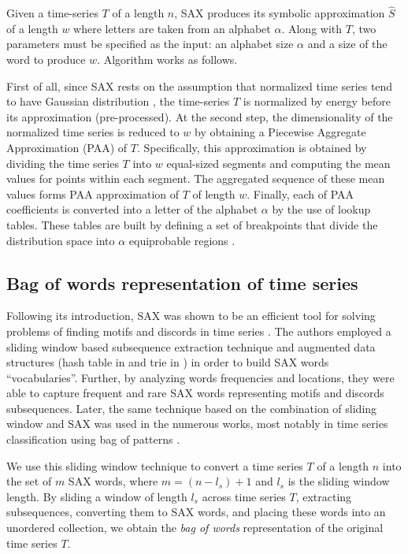 \documentclass{llncs}
\begin{document}
Given a time-series $T$ of a length $n$, SAX produces its symbolic approximation $\hat{S}$ of 
a length $w$ where letters are taken from an alphabet $\alpha$. 
Along with $T$, two parameters must be specified as the input: an alphabet size $\alpha$ and 
a size of the word to produce $w$. Algorithm works as follows. 

First of all, since SAX rests on the assumption that normalized time series  tend to have Gaussian 
distribution \cite{larsen_marx}, the time-series  $T$ is normalized by energy  
\cite{goldin_kanellakis} before its approximation (pre-processed). 
At the second step, the dimensionality of the normalized time series is reduced to $w$ by 
obtaining a Piecewise Aggregate Approximation (PAA) of $T$. 
Specifically, this approximation is obtained by dividing the time series $T$ into $w$ 
equal-sized segments and computing the mean values for points within each segment. 
The aggregated sequence of these mean values forms PAA approximation of $T$ of length $w$.
Finally, each of PAA coefficients is converted into a letter of the alphabet $\alpha$ by the use 
of lookup tables. These tables are built by defining a set of breakpoints that divide the 
distribution space into $\alpha$ equiprobable regions \cite{sax}.

\subsection{Bag of words representation of time series} \label{bow_representation}
Following its introduction, SAX was shown to be an efficient tool for solving problems 
of finding motifs and discords in time series \cite{motifs} \cite{hot_sax}. 
The authors employed a sliding window based subsequence extraction technique 
and augmented data structures (hash table in \cite{motifs} and trie in \cite{hot_sax}) 
in order to build SAX words ``vocabularies''. Further, by analyzing words frequencies 
and locations, they were able to capture frequent and rare SAX words representing 
motifs and discords subsequences. Later, the same technique based on the combination 
of sliding window and SAX was used in the numerous works, most notably in time series 
classification using bag of patterns \cite{bag_patterns}. 

We use this sliding window technique to convert a time series $T$ of a length $n$ into 
the set of $m$ SAX words, where $m=(n-l_{s})+1$ and $l_{s}$ is the sliding window length. 
By sliding a window of length $l_{s}$ across time series $T$, extracting subsequences, 
converting them to SAX words, and placing these words into an unordered collection, 
we obtain the \textit{bag of words} representation of the original time series $T$.
\end{document}
